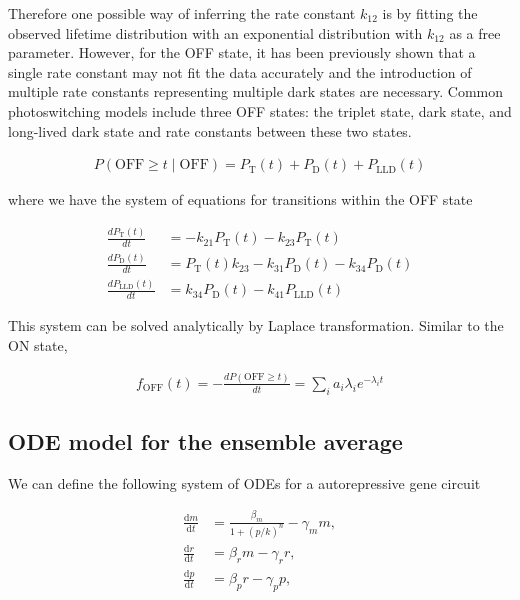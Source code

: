 \documentclass{ucetd}
\begin{document}
\begin{appendices}
Therefore one possible way of inferring the rate constant $k_{12}$ is by fitting the observed lifetime distribution with an exponential distribution with $k_{12}$ as a free parameter. However, for the OFF state, it has been previously shown that a single rate constant may not fit the data accurately and the introduction of multiple rate constants representing multiple dark states are necessary. Common photoswitching models include three OFF states: the triplet state, dark state, and long-lived dark state and rate constants between these two states.

\begin{align*}
P(\mathrm{OFF} \geq t\; | \; \mathrm{OFF}) = P_{\mathrm{T}}(t) + P_{\mathrm{D}}(t) + P_{\mathrm{LLD}}(t)
\end{align*}

where we have the system of equations for transitions within the OFF state

\begin{align*}
\frac{dP_{\mathrm{T}}(t)}{dt} &= -k_{21}P_{\mathrm{T}}(t) - k_{23}P_{\mathrm{T}}(t)\\
\frac{dP_{\mathrm{D}}(t)}{dt} &= P_{\mathrm{T}}(t)k_{23}-k_{31}P_{\mathrm{D}}(t) - k_{34}P_{\mathrm{D}}(t)\\
\frac{dP_{\mathrm{LLD}}(t)}{dt} &= k_{34}P_{\mathrm{D}}(t) - k_{41}P_{\mathrm{LLD}}(t)
\end{align*}

This system can be solved analytically by Laplace transformation. Similar to the ON state, 

\begin{align*}
f_{\mathrm{OFF}}(t) = -\frac{dP(\mathrm{OFF} \geq t)}{dt} = \sum_{i}a_{i}\lambda_{i}e^{-\lambda_{i}t}
\end{align*}


\subsection{ODE model for the ensemble average}

We can define the following system of ODEs for a autorepressive gene circuit

\begin{align}
\frac{\mathrm{d}m}{\mathrm{d}t} &= \frac{\beta_{m}}{1 + (p/k)^n} - \gamma_m m,\\[1em]
\frac{\mathrm{d}r}{\mathrm{d}t} &= \beta_{r} m - \gamma_r r,\\[1em]
\frac{\mathrm{d}p}{\mathrm{d}t} &= \beta_{p} r - \gamma_{p} p,
\end{align}


\end{appendices}
\end{document}
